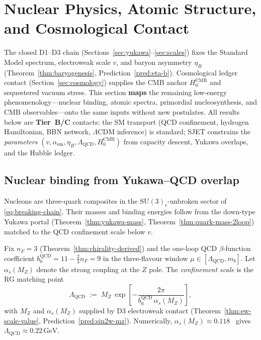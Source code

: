 \section{Nuclear Physics, Atomic Structure, and Cosmological Contact}
\label{sec:nuclear-atomic-cosmo}

The closed D1--D3 chain (Sections~\ref{sec:yukawa}--\ref{sec:scales}) fixes
the Standard Model spectrum, electroweak scale $v$, and baryon asymmetry
$\eta_B$ (Theorem~\ref{thm:baryogenesis}, Prediction~\ref{pred:eta-b}).
Cosmological ledger contact (Section~\ref{sec:cosmology}) supplies the CMB
anchor $H_0^{\mathrm{CMB}}$ and sequestered vacuum stress. This section
\textbf{maps} the remaining low-energy phenomenology---nuclear binding,
atomic spectra, primordial nucleosynthesis, and CMB observables---onto the
same inputs without new postulates. All results below are \textbf{Tier~B/C}
contacts: the SM transport (QCD confinement, hydrogen Hamiltonian, BBN network,
$\Lambda$CDM inference) is standard; SJET constrains the \emph{parameters}
$(v,\alpha_{\mathrm{em}},\eta_B,\Lambda_{\mathrm{QCD}},H_0^{\mathrm{CMB}})$
from capacity descent, Yukawa overlaps, and the Hubble ledger.

\subsection{Nuclear binding from Yukawa--QCD overlap}
\label{sec:nuclear:binding}

Nucleons are three-quark composites in the $\mathrm{SU}(3)_c$-unbroken sector
of \eqref{eq:breaking-chain}. Their masses and binding energies follow from
the down-type Yukawa portal (Theorem~\ref{thm:yukawa-mass},
Theorem~\ref{thm:quark-mass-2loop}) matched to the QCD confinement scale
below $v$.

\begin{definition}
\label{def:lambda-qcd}
Fix $n_F=3$ (Theorem~\ref{thm:chirality-derived}) and the one-loop QCD
$\beta$-function coefficient $b_0^{\mathrm{QCD}}=11-\tfrac{2}{3}n_F=9$ in the
three-flavour window $\mu\in[\Lambda_{\mathrm{QCD}},m_b]$. Let
$\alpha_s(M_Z)$ denote the strong coupling at the $Z$ pole. The
\emph{confinement scale} is the RG matching point
\begin{equation}\label{eq:lambda-qcd}
  \Lambda_{\mathrm{QCD}}
  \;:=\;
  M_Z\,
  \exp\!\left[-\frac{2\pi}{b_0^{\mathrm{QCD}}\,\alpha_s(M_Z)}\right],
\end{equation}
with $M_Z$ and $\alpha_s(M_Z)$ supplied by D3 electroweak contact
(Theorem~\ref{thm:ew-scale-value}, Prediction~\ref{pred:sin2w-mz}). Numerically,
$\alpha_s(M_Z)\approx 0.118$~\cite{PDG2025} gives
$\Lambda_{\mathrm{QCD}}\approx 0.22\,\mathrm{GeV}$.
\end{definition}

